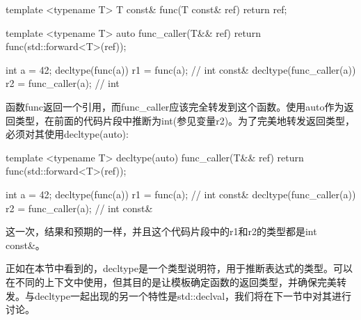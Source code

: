 \begin{cpp}
template <typename T>
T const& func(T const& ref)
{
	return ref;
}

template <typename T>
auto func_caller(T&& ref)
{
return func(std::forward<T>(ref));
}

int a = 42;
decltype(func(a)) r1 = func(a); // int const&
decltype(func_caller(a)) r2 = func_caller(a); // int
\end{cpp}

函数func返回一个引用，而func\_caller应该完全转发到这个函数。使用auto作为返回类型，在前面的代码片段中推断为int(参见变量r2)。为了完美地转发返回类型，必须对其使用decltype(auto):

\begin{cpp}
template <typename T>
decltype(auto) func_caller(T&& ref)
{
	return func(std::forward<T>(ref));
}

int a = 42;
decltype(func(a)) r1 = func(a); // int const&
decltype(func_caller(a)) r2 = func_caller(a); // int const&
\end{cpp}

这一次，结果和预期的一样，并且这个代码片段中的r1和r2的类型都是int const\&。

正如在本节中看到的，decltype是一个类型说明符，用于推断表达式的类型。可以在不同的上下文中使用，但其目的是让模板确定函数的返回类型，并确保完美转发。与decltype一起出现的另一个特性是std::declval，我们将在下一节中对其进行讨论。









